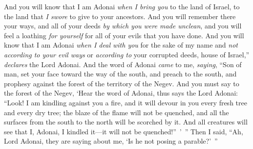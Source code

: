 \begin{biblechapter}
\verse And you will know that I am Adonai \textit{when I bring you} to the land of Israel, to the land that \textit{I swore} to give to your ancestors.
\verse And you will remember there your ways, and all of your deeds \textit{by which you were made unclean}, and you will feel a loathing \textit{for yourself} for all of your evils that you have done.
\verse And you will know that I am Adonai \textit{when I deal with you} for the sake of my name and \textit{not according to your evil ways} or \textit{according to} your corrupted deeds, house of Israel,” \textit{declares} the Lord Adonai.
\verse  And the word of Adonai \textit{came} to me, \textit{saying},
\verse “Son of man, set your face toward the way of the south, and preach to the south, and prophesy against the forest of the territory of the Negev.
\verse And you must say to the forest of the Negev, ‘Hear the word of Adonai, thus says the Lord Adonai: “Look! I am kindling against you a fire, and it will devour in you every fresh tree and every dry tree; the blaze of the flame will not be quenched, and all the surfaces from the south to the north will be scorched by it.
\verse And all creatures will see that I, Adonai, I kindled it—it will not be quenched!” ’ ”
\verse Then I said, “Ah, Lord Adonai, they are saying about me, ‘Is he not posing a parable?’ ”
\end{biblechapter}

